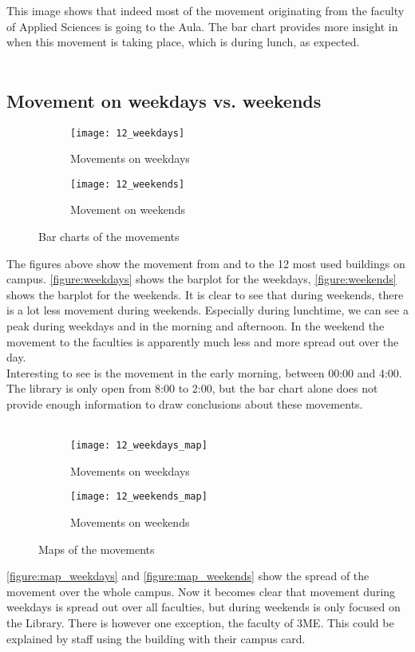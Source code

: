 This image shows that indeed most of the movement originating from the faculty of Applied Sciences is going to the Aula. The bar chart provides more insight in when this movement is taking place, which is during lunch, as expected. 
\\\\
\subsection{Movement on weekdays vs. weekends}
\begin{figure}[H]
	\centering
	\captionsetup[subfigure]{justification=centering}
	\begin{subfigure}[t]{0.48\textwidth}
	\texttt{[image: 12\_weekdays]}
	\caption{Movements on weekdays}
	\label{figure:weekdays}
	\end{subfigure}
	\begin{subfigure}[t]{0.48\textwidth}
	\texttt{[image: 12\_weekends]}
	\caption{Movement on weekends}
	\label{figure:weekends}
	\end{subfigure}
	\captionsetup{justification=centering}
	\caption{Bar charts of the movements}
\end{figure}

The figures above show the movement from and to the 12 most used buildings on campus. \autoref{figure:weekdays} shows the barplot for the weekdays, \autoref{figure:weekends} shows the barplot for the weekends. It is clear to see that during weekends, there is a lot less movement during weekends. Especially during lunchtime, we can see a peak during weekdays and in the morning and afternoon. In the weekend the movement to the faculties is apparently much less and more spread out over the day.\\
Interesting to see is the movement in the early morning, between 00:00 and 4:00. The library is only open from 8:00 to 2:00, but the bar chart alone does not provide enough information to draw conclusions about these movements.\\\\
\begin{figure}[H]
	\captionsetup[subfigure]{justification=centering}
	\begin{subfigure}[t]{0.48\textwidth}
	\texttt{[image: 12\_weekdays\_map]}
	\caption{Movements on weekdays}
	\label{figure:map_weekdays}
	\end{subfigure}
	\begin{subfigure}[t]{0.48\textwidth}
	\texttt{[image: 12\_weekends\_map]}
	\caption{Movements on weekends}
	\label{figure:map_weekends}
	\end{subfigure}
	\captionsetup{justification=centering}
	\caption{Maps of the movements}
\end{figure}
\autoref{figure:map_weekdays} and \autoref{figure:map_weekends} show the spread of the movement over the whole campus. Now it becomes clear that movement during weekdays is spread out over all faculties, but during weekends is only focused on the Library. There is however one exception, the faculty of 3ME. This could be explained by staff using the building with their campus card. \\

